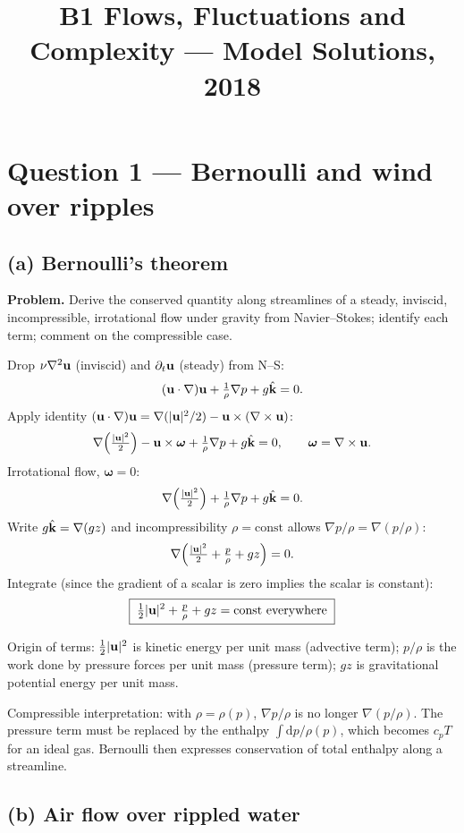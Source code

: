 \documentclass[11pt]{article}
\title{B1 Flows, Fluctuations and Complexity --- Model Solutions, 2018}
\author{}
\date{}
\newcommand{\de}{\mathrm{d}}
\newcommand{\Lap}{\nabla^{2}}
\begin{document}
\maketitle

\section*{Question 1 --- Bernoulli and wind over ripples}

\subsection*{(a) Bernoulli's theorem}

\textbf{Problem.} Derive the conserved quantity along streamlines of a steady, inviscid, incompressible, irrotational flow under gravity from Navier--Stokes; identify each term; comment on the compressible case.

Drop $\nu\Lap\vb u$ (inviscid) and $\partial_t\vb u$ (steady) from N--S:
\[
(\vb u\cdot\nabla)\vb u + \tfrac{1}{\rho}\nabla p + g\hat{\vb k} = 0.
\]
Apply identity $(\vb u\cdot\nabla)\vb u = \nabla(|\vb u|^2/2) - \vb u\times(\nabla\times\vb u)$:
\[
\nabla\!\left(\tfrac{|\vb u|^2}{2}\right) - \vb u\times\bm\omega + \tfrac{1}{\rho}\nabla p + g\hat{\vb k} = 0,\qquad \bm\omega = \nabla\times\vb u.
\]
Irrotational flow, $\bm\omega = 0$:
\[
\nabla\!\left(\tfrac{|\vb u|^2}{2}\right) + \tfrac{1}{\rho}\nabla p + g\hat{\vb k} = 0.
\]
Write $g\hat{\vb k} = \nabla(gz)$ and incompressibility $\rho=\text{const}$ allows $\nabla p/\rho = \nabla(p/\rho)$:
\[
\nabla\!\left(\tfrac{|\vb u|^2}{2} + \tfrac{p}{\rho} + g z\right) = 0.
\]
Integrate (since the gradient of a scalar is zero implies the scalar is constant):
\[
\boxed{\;\tfrac{1}{2}|\vb u|^2 + \tfrac{p}{\rho} + g z = \text{const everywhere}\;}
\]

Origin of terms: $\tfrac{1}{2}|\vb u|^2$ is kinetic energy per unit mass (advective term); $p/\rho$ is the work done by pressure forces per unit mass (pressure term); $gz$ is gravitational potential energy per unit mass.

Compressible interpretation: with $\rho = \rho(p)$, $\nabla p/\rho$ is no longer $\nabla(p/\rho)$. The pressure term must be replaced by the enthalpy $\int \de p/\rho(p)$, which becomes $c_p T$ for an ideal gas. Bernoulli then expresses conservation of total enthalpy along a streamline.

\subsection*{(b) Air flow over rippled water}
\end{document}
